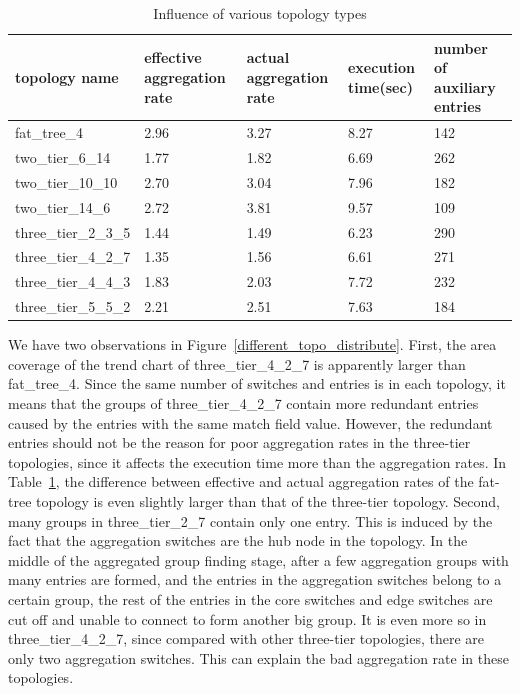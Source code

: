 \begin{table}
\centering
\caption{Influence of various topology types}
\begin{tabular}{|l|p{2.5cm}|p{2.5cm}|p{1.9cm}|p{2.8cm}|}
\hline topology name & effective aggregation rate & actual aggregation rate & execution time(sec) & number of auxiliary entries \\
\hline
\hline fat\_tree\_4 & 2.96 & 3.27 & 8.27 & 142 \\
\hline two\_tier\_6\_14 & 1.77 & 1.82 & 6.69 & 262 \\ 
\hline two\_tier\_10\_10 & 2.70 & 3.04 & 7.96 & 182 \\
\hline two\_tier\_14\_6 & 2.72 & 3.81 & 9.57 & 109 \\ 
\hline three\_tier\_2\_3\_5 & 1.44 & 1.49 & 6.23 & 290 \\
\hline three\_tier\_4\_2\_7 & 1.35 & 1.56 & 6.61 & 271 \\
\hline three\_tier\_4\_4\_3 & 1.83 & 2.03 & 7.72 & 232 \\
\hline three\_tier\_5\_5\_2 & 2.21 & 2.51 & 7.63 & 184 \\
\hline
\end{tabular}
\label{table:different_topo_type}
\end{table}

We have two observations in Figure~\ref{different_topo_distribute}. First, the area coverage of the trend chart of three\_tier\_4\_2\_7 is apparently larger than fat\_tree\_4. Since the same number of switches and entries is in each topology, it means that the groups of three\_tier\_4\_2\_7 contain more redundant entries caused by the entries with the same match field value. However, the redundant entries \sout{} should not be the reason for poor aggregation rates in the three-tier topologies, since it \sout{} affects the execution time more than the aggregation rates. In Table~\ref{table:different_topo_type}, the difference between effective and actual aggregation rates of the fat-tree topology is even slightly larger than that of the three-tier topology. Second, many groups in three\_tier\_2\_7 contain only one entry. This is induced by the fact that the aggregation switches are the hub node in the topology. In the middle of the aggregated group finding stage, after a few aggregation groups with many entries are formed, and the entries in the aggregation switches belong to a certain group, the rest of the entries in the core switches and edge switches are cut off and unable to connect to form another big group. It is even more so in three\_tier\_4\_2\_7, since compared with other three-tier topologies, there are only two aggregation switches. This can explain the bad aggregation rate in these topologies.

